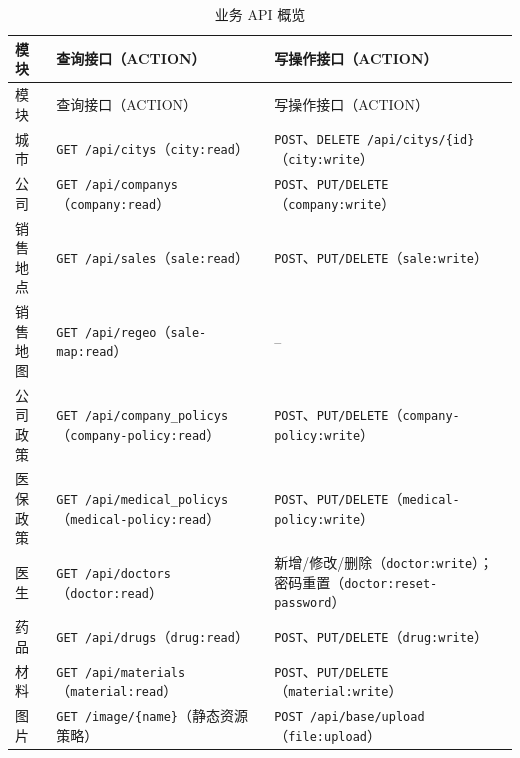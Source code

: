 \documentclass[UTF8,a4paper,12pt,openany,fontset=windows]{ctexrep}
\begin{document}
\begin{longtable}{p{2.5cm}p{5.2cm}p{5.8cm}}
  \caption{业务 API 概览}\label{tab:business-api}\\
  \toprule
  模块 & 查询接口（ACTION） & 写操作接口（ACTION） \\
  \midrule
  \endfirsthead
  \toprule
  模块 & 查询接口（ACTION） & 写操作接口（ACTION） \\
  \midrule
  \endhead
  城市 & \texttt{GET /api/citys}（\texttt{city:read}） & \texttt{POST}、\texttt{DELETE /api/citys/\{id\}}（\texttt{city:write}） \\
  公司 & \texttt{GET /api/companys}（\texttt{company:read}） & \texttt{POST}、\texttt{PUT/DELETE}（\texttt{company:write}） \\
  销售地点 & \texttt{GET /api/sales}（\texttt{sale:read}） & \texttt{POST}、\texttt{PUT/DELETE}（\texttt{sale:write}） \\
  销售地图 & \texttt{GET /api/regeo}（\texttt{sale-map:read}） & -- \\
  公司政策 & \texttt{GET /api/company\_policys}（\texttt{company-policy:read}） & \texttt{POST}、\texttt{PUT/DELETE}（\texttt{company-policy:write}） \\
  医保政策 & \texttt{GET /api/medical\_policys}（\texttt{medical-policy:read}） & \texttt{POST}、\texttt{PUT/DELETE}（\texttt{medical-policy:write}） \\
  医生 & \texttt{GET /api/doctors}（\texttt{doctor:read}） & 新增/修改/删除（\texttt{doctor:write}）；密码重置（\texttt{doctor:reset-password}） \\
  药品 & \texttt{GET /api/drugs}（\texttt{drug:read}） & \texttt{POST}、\texttt{PUT/DELETE}（\texttt{drug:write}） \\
  材料 & \texttt{GET /api/materials}（\texttt{material:read}） & \texttt{POST}、\texttt{PUT/DELETE}（\texttt{material:write}） \\
  图片 & \texttt{GET /image/\{name\}}（静态资源策略） & \texttt{POST /api/base/upload}（\texttt{file:upload}） \\
  \bottomrule
\end{longtable}
\end{document}
